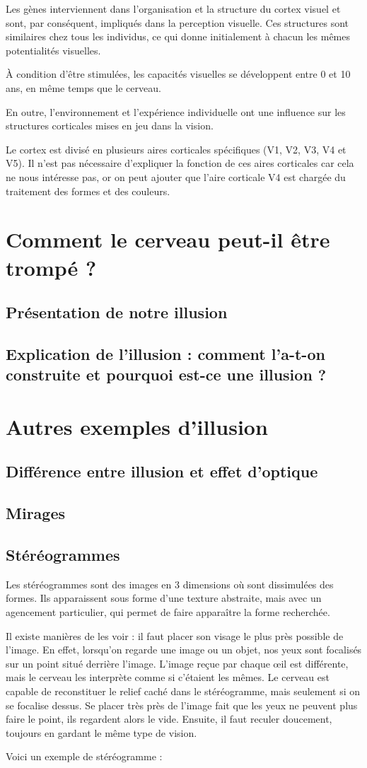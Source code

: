 \documentclass[a4paper, 12pt, onecolumn, openany]{report}
\begin{document}
	Les gènes interviennent dans l'organisation et la structure du cortex visuel et sont, par conséquent, impliqués dans la perception visuelle. Ces structures sont similaires chez tous les individus, ce qui donne initialement à chacun les mêmes potentialités visuelles.
	
	À condition d'être stimulées, les capacités visuelles se développent entre 0 et 10 ans, en même temps que le cerveau.
	
	En outre, l'environnement et l'expérience individuelle ont une influence sur les structures corticales mises en jeu dans la vision.
	
	Le cortex est divisé en plusieurs aires corticales spécifiques (V1, V2, V3, V4 et V5). Il n'est pas nécessaire d'expliquer la fonction de ces aires corticales car cela ne nous intéresse pas, or on peut ajouter que l'aire corticale V4 est chargée du traitement des formes et des couleurs.

\chapter{Comment le cerveau peut-il être trompé ?}
	\section{Présentation de notre illusion}
	\section{Explication de l'illusion : comment l'a-t-on construite et pourquoi est-ce une illusion ?}
\chapter{Autres exemples d'illusion}
	\section{Différence entre illusion et effet d'optique}
	\section{Mirages}
	\section{Stéréogrammes}
	Les stéréogrammes sont des images en 3 dimensions où sont dissimulées des formes. Ils apparaissent sous forme d’une texture abstraite, mais avec un agencement particulier, qui permet de faire apparaître la forme recherchée.
	
	Il existe manières de les voir : il faut placer son visage le plus près possible de l’image. En effet, lorsqu’on regarde une image ou un objet, nos yeux sont focalisés sur un point situé derrière l’image. L’image reçue par chaque œil est différente, mais le cerveau les interprète comme si c’étaient les mêmes. Le cerveau est capable de reconstituer le relief caché dans le stéréogramme, mais seulement si on se focalise dessus. Se placer très près de l’image fait que les yeux ne peuvent plus faire le point, ils regardent alors le vide. Ensuite, il faut reculer doucement, toujours en gardant le même type de vision. 
	
	Voici un exemple de stéréogramme :
\end{document}
